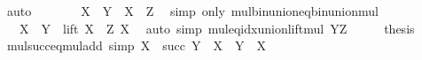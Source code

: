 \begin{isabellebody}
\ auto\isanewline
\ \ \isamarkupfalse%
\ \isamarkupfalse%
\ {\isachardoublequoteopen}{\isachardot}{\kern0pt}{\isachardot}{\kern0pt}{\isachardot}{\kern0pt}\ {\isacharequal}{\kern0pt}\ {\isacharparenleft}{\kern0pt}X\ {\isacharasterisk}{\kern0pt}\ Y{\isacharparenright}{\kern0pt}\ {\isasymunion}\ {\isacharparenleft}{\kern0pt}X\ {\isacharasterisk}{\kern0pt}\ {\isacharbraceleft}{\kern0pt}Z{\isacharbraceright}{\kern0pt}{\isacharparenright}{\kern0pt}{\isachardoublequoteclose}\ \isamarkupfalse%
\ {\isacharparenleft}{\kern0pt}simp\ only{\isacharcolon}{\kern0pt}\ mul{\isacharunderscore}{\kern0pt}bin{\isacharunderscore}{\kern0pt}union{\isacharunderscore}{\kern0pt}eq{\isacharunderscore}{\kern0pt}bin{\isacharunderscore}{\kern0pt}union{\isacharunderscore}{\kern0pt}mul{\isacharparenright}{\kern0pt}\isanewline
\ \ \isamarkupfalse%
\ \isamarkupfalse%
\ {\isachardoublequoteopen}{\isachardot}{\kern0pt}{\isachardot}{\kern0pt}{\isachardot}{\kern0pt}\ {\isacharequal}{\kern0pt}\ {\isacharparenleft}{\kern0pt}X\ {\isacharasterisk}{\kern0pt}\ Y{\isacharparenright}{\kern0pt}\ {\isasymunion}\ lift\ {\isacharparenleft}{\kern0pt}X\ {\isacharasterisk}{\kern0pt}\ Z{\isacharparenright}{\kern0pt}\ X{\isachardoublequoteclose}\ \isamarkupfalse%
\ {\isacharparenleft}{\kern0pt}auto\ simp{\isacharcolon}{\kern0pt}\ mul{\isacharunderscore}{\kern0pt}eq{\isacharunderscore}{\kern0pt}idx{\isacharunderscore}{\kern0pt}union{\isacharunderscore}{\kern0pt}lift{\isacharunderscore}{\kern0pt}mul{\isacharbrackleft}{\kern0pt}\ {\isacharquery}{\kern0pt}Y{\isacharequal}{\kern0pt}{\isachardoublequoteopen}{\isacharbraceleft}{\kern0pt}Z{\isacharbraceright}{\kern0pt}{\isachardoublequoteclose}{\isacharbrackright}{\kern0pt}{\isacharparenright}{\kern0pt}\isanewline
\ \ \isamarkupfalse%
\ \isamarkupfalse%
\ {\isacharquery}{\kern0pt}thesis\ \isacommand{{\isachardot}{\kern0pt}}\isamarkupfalse%
\isanewline
{}\isamarkupfalse%
%
\endisatagproof
{\isafoldproof}%
%
\isadelimproof
\isanewline
%
\endisadelimproof
\isanewline
{}\isamarkupfalse%
\ mul{\isacharunderscore}{\kern0pt}succ{\isacharunderscore}{\kern0pt}eq{\isacharunderscore}{\kern0pt}mul{\isacharunderscore}{\kern0pt}add\ {\isacharbrackleft}{\kern0pt}simp{\isacharbrackright}{\kern0pt}{\isacharcolon}{\kern0pt}\ {\isachardoublequoteopen}X\ {\isacharasterisk}{\kern0pt}\ succ\ Y\ {\isacharequal}{\kern0pt}\ X\ {\isacharasterisk}{\kern0pt}\ Y\ {\isacharplus}{\kern0pt}\ X{\isachardoublequoteclose}\isanewline

\end{isabellebody}
